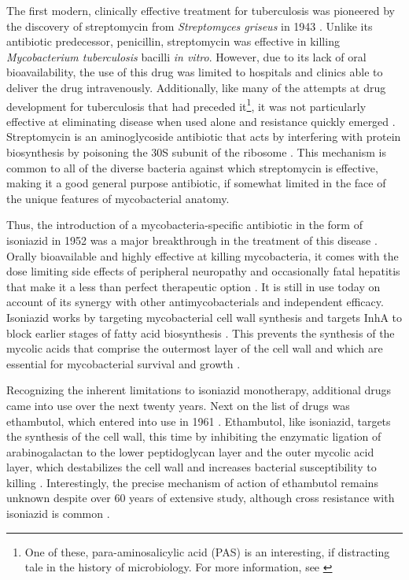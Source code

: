 The first modern, clinically effective treatment for tuberculosis was pioneered by the discovery of streptomycin from \textit{Streptomyces griseus} in 1943 \citep{Comroe1978, Hinshaw1946, Hinshaw1947}. Unlike its antibiotic predecessor, penicillin, streptomycin was effective in killing \textit{Mycobacterium tuberculosis} bacilli \textit{in vitro}. However, due to its lack of oral bioavailability, the use of this drug was limited to hospitals and clinics able to deliver the drug intravenously. Additionally, like many of the attempts at drug development for tuberculosis that had preceded it\footnote{One of these, para\hyp{}aminosalicylic acid (PAS) is an interesting, if distracting tale in the history of microbiology. For more information, see \citep{Donald2015, Dubovsky1988}}, it was not particularly effective at eliminating disease when used alone and resistance quickly emerged \citep{Pfuetze1949, Ruiz2003}. Streptomycin is an aminoglycoside antibiotic that acts by interfering with protein biosynthesis by poisoning the 30S subunit of the ribosome \citep{Sharma2007}. This mechanism is common to all of the diverse bacteria against which streptomycin is effective, making it a good general purpose antibiotic, if somewhat limited in the face of the unique features of mycobacterial anatomy.

Thus, the introduction of a mycobacteria\hyp{}specific antibiotic in the form of isoniazid in 1952 was a major breakthrough in the treatment of this disease \citep{Goldman1972}. Orally bioavailable and highly effective at killing mycobacteria, it comes with the dose limiting side effects of peripheral neuropathy and occasionally fatal hepatitis that make it a less than perfect therapeutic option \citep{Maddrey1973, Black1975, Metushi2011, Metushi2016, Diallo2018}. It is still in use today on account of its synergy with other antimycobacterials and independent efficacy. Isoniazid works by targeting mycobacterial cell wall synthesis and targets InhA to block earlier stages of fatty acid biosynthesis \citep{Timmins2006, Vilcheze2007}. This prevents the synthesis of the mycolic acids that comprise the outermost layer of the cell wall and which are essential for mycobacterial survival and growth \citep{Lei2000, Rozwarski1998, Vilcheze2006, Timmins2006}. 

Recognizing the inherent limitations to isoniazid monotherapy, additional drugs came into use over the next twenty years. Next on the list of drugs was ethambutol, which entered into use in 1961 \citep{Thomas1961, Chakraborty2015}. Ethambutol, like isoniazid, targets the synthesis of the cell wall, this time by inhibiting the enzymatic ligation of arabinogalactan to the lower peptidoglycan layer and the outer mycolic acid layer, which destabilizes the cell wall and increases bacterial susceptibility to killing \citep{Zhang2020a, Safi2013}. Interestingly, the precise mechanism of action of ethambutol remains unknown despite over 60 years of extensive study, although cross resistance with isoniazid is common \citep{Zhang2020a, Gupta2006}.

